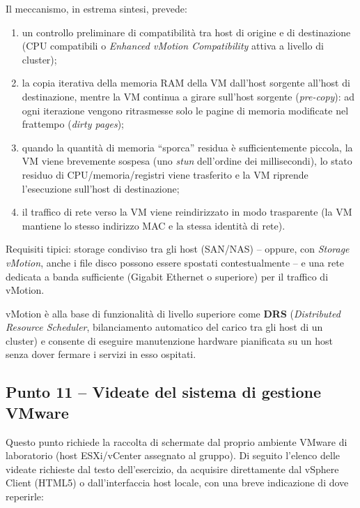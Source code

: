 \documentclass[11pt,a4paper]{article}
\begin{document}
Il meccanismo, in estrema sintesi, prevede:
\begin{enumerate}[nosep]
    \item un controllo preliminare di compatibilità tra host di origine e di destinazione (CPU compatibili o \emph{Enhanced vMotion Compatibility} attiva a livello di cluster);
    \item la copia iterativa della memoria RAM della VM dall'host sorgente all'host di destinazione, mentre la VM continua a girare sull'host sorgente (\emph{pre-copy}): ad ogni iterazione vengono ritrasmesse solo le pagine di memoria modificate nel frattempo (\emph{dirty pages});
    \item quando la quantità di memoria ``sporca'' residua è sufficientemente piccola, la VM viene brevemente sospesa (uno \emph{stun} dell'ordine dei millisecondi), lo stato residuo di CPU/memoria/registri viene trasferito e la VM riprende l'esecuzione sull'host di destinazione;
    \item il traffico di rete verso la VM viene reindirizzato in modo trasparente (la VM mantiene lo stesso indirizzo MAC e la stessa identità di rete).
\end{enumerate}

Requisiti tipici: storage condiviso tra gli host (SAN/NAS) -- oppure, con \emph{Storage vMotion}, anche i file disco possono essere spostati contestualmente -- e una rete dedicata a banda sufficiente (Gigabit Ethernet o superiore) per il traffico di vMotion.

vMotion è alla base di funzionalità di livello superiore come \textbf{DRS} (\emph{Distributed Resource Scheduler}, bilanciamento automatico del carico tra gli host di un cluster) e consente di eseguire manutenzione hardware pianificata su un host senza dover fermare i servizi in esso ospitati.

\subsection{Punto 11 -- Videate del sistema di gestione VMware}

Questo punto richiede la raccolta di schermate dal proprio ambiente VMware di laboratorio (host ESXi/vCenter assegnato al gruppo). Di seguito l'elenco delle videate richieste dal testo dell'esercizio, da acquisire direttamente dal vSphere Client (HTML5) o dall'interfaccia host locale, con una breve indicazione di dove reperirle:
\end{document}
